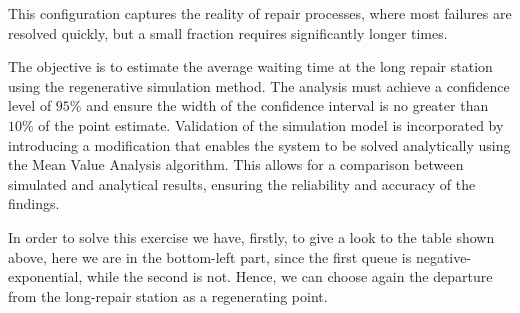 \documentclass[12pt]{article}
\begin{document}
	This configuration captures the reality of repair processes, where most failures are resolved quickly, but a small fraction requires significantly longer times.
	
	The objective is to estimate the average waiting time at the long repair station using the regenerative simulation method. The analysis must achieve a confidence level of $95\%$ and ensure the width of the confidence interval is no greater than $10\%$ of the point estimate. Validation of the simulation model is incorporated by introducing a modification that enables the system to be solved analytically using the Mean Value Analysis algorithm. This allows for a comparison between simulated and analytical results, ensuring the reliability and accuracy of the findings.
	
	In order to solve this exercise we have, firstly, to give a look to the table shown above, here we are in the bottom-left part, since the first queue is negative-exponential, while the second is not. Hence, we can choose again the departure from the long-repair station as a regenerating point.
	
	
\end{document}
